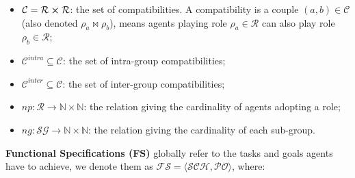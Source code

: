 \documentclass[runningheads]{llncs}
\theoremstyle{freethm}
\theoremstyle{proofoutline}
\newcounter{relation}
\begin{document}
\begin{itemize}
\begin{itemize}
              \item $\mathcal{C} = \mathcal{R} \cross \mathcal{R}$: the set of compatibilities. A compatibility is a couple $(a,b) \in \mathcal{C}$ (also denoted $\rho_a \bowtie \rho_b$), means agents playing role $\rho_a \in \mathcal{R}$ can also play role $\rho_b \in \mathcal{R}$;
              \item $\mathcal{C}^{intra} \subseteq \mathcal{C}$: the set of intra-group compatibilities;
              \item $\mathcal{C}^{inter} \subseteq \mathcal{C}$: the set of inter-group compatibilities;

              \item $np: \mathcal{R} \rightarrow \mathbb{N} \times \mathbb{N}$: the relation giving the cardinality of agents adopting a role;
              \item $ng: \mathcal{SG} \rightarrow \mathbb{N} \times \mathbb{N}$: the relation giving the cardinality of each sub-group.

          \end{itemize}

\end{itemize}

\textbf{Functional Specifications (FS)} globally refer to the tasks and goals agents have to achieve, we denote them as $\mathcal{FS} = \langle \mathcal{SCH}, \mathcal{PO} \rangle$, where:
\end{document}
